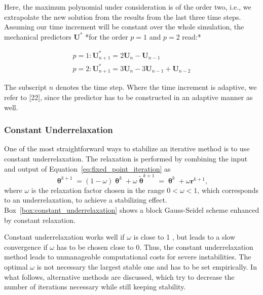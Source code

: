 Here, the maximum polynomial under consideration is of the order two, i.e., we extrapolate the new solution from the results from the last three time steps. Assuming our time increment will be constant over the whole simulation, the mechanical predictors $\mathbf{U}^{*}$ *for the order $p=1$ and $p=2$ read:*

$$
\begin{array}{l}
p=1: \mathbf{U}_{n+1}^{*}=2 \mathbf{U}_{n}-\mathbf{U}_{n-1} \\
p=2: \mathbf{U}_{n+1}^{*}=3 \mathbf{U}_{n}-3 \mathbf{U}_{n-1}+\mathbf{U}_{n-2}
\end{array}
$$

The subscript $n$ denotes the time step. Where the time increment is adaptive, we refer to [22], since the predictor has to be constructed in an adaptive manner as well.

\subsubsection{Constant Underrelaxation}

One of the most straightforward ways to stabilize an iterative method is to use constant underrelaxation.
The relaxation is performed by combining the input and output of Equation~\eqref{eq:fixed_point_iteration} as
\begin{equation} \label{eq:constant_relaxation}
\bm \uptheta^{k+1}=(1-\omega) \bm\uptheta^{k}+\omega \tilde{\bm\uptheta}^{k+1}=\bm\uptheta^{k}+\omega \mathbf{r}^{k+1},
\end{equation}
where \(\omega\) is the relaxation factor chosen in the range \(0<\omega<1\), which corresponds to an underrelaxation, to achieve a stabilizing effect.
Box~\ref{box:constant_underrelaxation} shows a block Gauss-Seidel scheme enhanced by constant relaxation.

Constant underrelaxation works well if \(\omega\) is close to 1 , but leads to a slow convergence if \(\omega\) has to be chosen close to 0.
Thus, the constant underrelaxation method leads to unmanageable computational costs for severe instabilities.
The optimal \(\omega\) is not necessary the largest stable one \citet{gatzhammer_efficient_2014} and has to be set empirically.
In what follows, alternative methods are discussed, which try to decrease the number of iterations necessary while still keeping stability.


